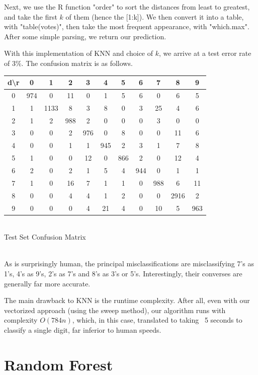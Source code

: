 \documentclass[10pt]{extarticle}
\begin{document}
Next, we use the R function "order" to sort the distances from least to greatest, and take the first $k$ of them (hence the [1:k]). We then convert it into a table, with "table(votes)", then take the most frequent appearance, with "which.max". After some simple parsing, we return our prediction. 

With this implementation of KNN and choice of $k$, we arrive at a test error rate of 3\%. The confusion matrix is as follows. 
 
\begin{minipage}{.6\textwidth}
	\begin{center}
	\begin{tabular}{c | c c c c c c c c c c}
	d\textbackslash r&0&1&2&3&4&5&6&7&8&9\\ \hline
	0& 974 & 0 & 11 & 0 & 1 & 5 & 6 & 0 & 6 & 5\\
	1&1&1133&8&3&8&0&3&25&4&6\\
	2& 1 & 2 & 988 & 2 & 0 & 0 & 0 & 3 & 0 & 0\\
	3& 0 & 0 & 2 & 976 & 0 & 8 & 0 & 0 & 11 & 6\\
	4& 0 & 0 & 1 & 1 & 945 & 2 & 3 & 1 & 7 & 8\\
	5& 1 & 0 & 0 & 12 & 0 & 866 & 2 & 0 & 12 & 4\\
	6& 2 & 0 & 2 & 1 & 5 & 4 & 944 & 0 & 1 & 1\\
	7& 1 & 0 & 16 & 7 & 1 & 1 & 0 & 988 & 6 & 11\\
	8& 0 & 0 & 4 & 4 & 1 & 2 & 0 & 0 & 2916 & 2\\
	9& 0 & 0 & 0 & 4 & 21 & 4 & 0 & 10 & 5 & 963
	\end{tabular}\\
	\bigskip
	Test Set Confusion Matrix
	\end{center}
\end{minipage}\\

As is surprisingly human, the principal misclassifications are misclassifying 7's as 1's, 4's as 9's, 2's as 7's and 8's as 3's or 5's. Interestingly, their converses are generally far more accurate. 

The main drawback to KNN is the runtime complexity. After all, even with our vectorized approach (using the sweep method), our algorithm runs with complexity $O(784n)$, which, in this case, translated to taking ~5 seconds to classify a single digit, far inferior to human speeds. 


\section{Random Forest}
\end{document}
